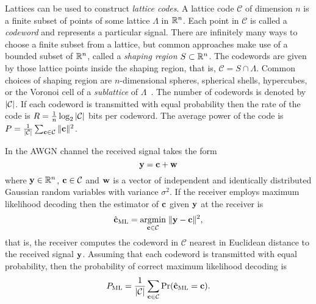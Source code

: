 \documentclass[journal]{IEEEtran}
\begin{document}
\newcommand{\calX}{\mathcal X}
\newcommand{\calC}{\mathcal C}
Lattices can be used to construct \emph{lattice codes}.  A lattice code $\calC$ of dimension $n$ is a finite subset of points of some lattice $\Lambda$ in ${\mathbb R}^n$.  Each point in $\calC$ is called a \emph{codeword} and represents a particular signal.  There are infinitely many ways to choose a finite subset from a lattice, but common approaches make use of a bounded subset of ${\mathbb R}^n$, called a \emph{shaping region} $S \subset {\mathbb R}^n$.  The codewords are given by those lattice points inside the shaping region, that is, $\calC = S \cap \Lambda.$  Common choices of shaping region are $n$-dimensional spheres, spherical shells, hypercubes, or the Voronoi cell of a \emph{sublattice} of $\Lambda$~\cite{Buda1989_some_opt_codes_structure,Erex2004_lattice_decoding,Conway1983VoronoiCodes}.  The number of codewords is denoted by $\abs{\calC}$.  If each codeword is transmitted with equal probability then the rate of the code is $R = \frac{1}{n}\log_2{\abs{\calC}}$ bits per codeword.  The average power of the code is $P = \frac{1}{\abs{\calC}}\sum_{\cbf \in \calC}\|\cbf\|^2$. 

In the AWGN channel the received signal takes the form
\[
\mathbf{y} = \mathbf{c} + \mathbf{w}
\]
where $\mathbf{y} \in {\mathbb R}^n$, $\cbf \in \calC$ and $\mathbf{w}$ is a vector of independent and identically distributed Gaussian random variables with variance $\sigma^2$.  If the receiver employs maximum likelihood decoding then the estimator of $\mathbf{c}$ given $\mathbf{y}$ at the receiver is
\begin{equation}\label{eq:mldecoder}
\hat{\cbf}_{\text{ML}} = \underset{\cbf \in \calC}{\operatorname{argmin}}\;\| \ybf - \cbf \|^2,
\end{equation}
that is, the receiver computes the codeword in $\calC$ nearest in Euclidean distance to the received signal $\mathbf{y}$.  Assuming that each codeword is transmitted with equal probability, then the probability of correct maximum likelihood decoding is
\[
P_{\text{ML}} = \frac{1}{\abs{\calC}}\sum_{\cbf \in \calC}\prob( \hat{\cbf}_{\text{ML}} = \cbf ).
\]
\end{document}
